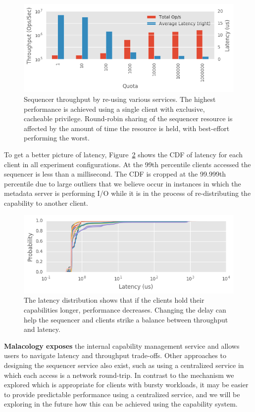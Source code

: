 \begin{figure}[tbp]
\centering
\includegraphics{figures/tradeoff.png}
\caption{Sequencer throughput by re-using various services.  The highest
performance is achieved using a single client with exclusive, cacheable
privilege. Round-robin sharing of the sequencer resource is affected by the
amount of time the resource is held, with best-effort performing the worst.}
\label{fig:captp}
\end{figure}

To get a better picture of latency, Figure~\ref{fig:capcdf} shows the CDF of
latency for each client in all experiment configurations. At the 99th
percentile clients accessed the sequencer is less than a millisecond. The CDF
is cropped at the 99.999th percentile due to large outliers that we believe
occur in instances in which the metadata server is performing I/O while it is in the
process of re-distributing the capability to another client.

\begin{figure}[tbp]
\centering
\includegraphics{figures/caps-delay-latency.png}
\caption{ The latency distribution shows that if the clients hold their
capabilities longer, performance decreases. Changing the delay can help the
sequencer and clients strike a balance between throughput and latency.}
\label{fig:capcdf}
\end{figure}

\textbf{Malacology exposes} the internal capability management service and
allows users to navigate latency and throughput trade-offs.  Other approaches
to designing the sequencer service also exist, such as using a centralized
service in which each access is a network round-trip. In contrast to the
mechanism we explored which is appropriate for clients with bursty workloads,
it may be easier to provide predictable performance using a centralized
service, and we will be exploring in the future how this can be achieved using
the capability system.

